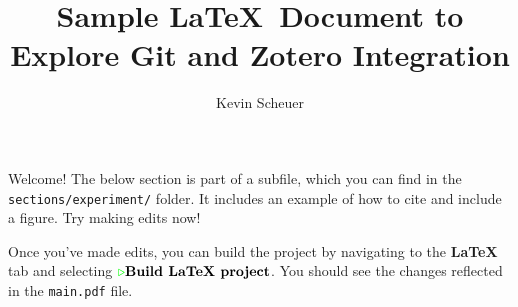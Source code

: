 \documentclass{article}
\title{Sample \LaTeX\ Document to Explore Git and Zotero Integration}
\author{Kevin Scheuer}
\begin{document}
\maketitle

Welcome! The below section is part of a subfile, which you can find in the
\colorbox{light-gray}{\texttt{sections/experiment/}} folder. It includes an example of
how to cite and include a figure. Try making edits now!

Once you've made edits, you can build the project by navigating to the \textbf{LaTeX} tab
and selecting $\textcolor{green}{\triangleright} \textbf{Build LaTeX project}$. You
should see the changes reflected in the \colorbox{light-gray}{\texttt{main.pdf}} file.



\newpage

\end{document}
